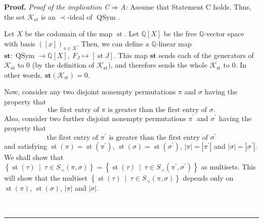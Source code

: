\documentclass[numbers=enddot,12pt,final,onecolumn,notitlepage]{scrartcl}%
\theoremstyle{definition}
\newenvironment{proof}[1][Proof]{\noindent\textbf{#1.} }{\ \rule{0.5em}{0.5em}}
\begin{document}
\begin{proof}
\textit{Proof of the implication C}$\Longrightarrow$\textit{A:} Assume that
Statement C holds. Thus, the set $\mathcal{K}_{\operatorname*{st}}$ is an
$\left.  \prec\right.  $-ideal of $\operatorname*{QSym}$.

Let $X$ be the codomain of the map $\operatorname*{st}$. Let $\mathbb{Q}%
\left[  X\right]  $ be the free $\mathbb{Q}$-vector space with basis $\left(
\left[  x\right]  \right)  _{x\in X}$. Then, we can define a $\mathbb{Q}%
$-linear map $\mathbf{st}:\operatorname*{QSym}\rightarrow\mathbb{Q}\left[
X\right]  ,\ F_{J}\mapsto\left[  \operatorname*{st}J\right]  $. This map
$\mathbf{st}$ sends each of the generators of $\mathcal{K}_{\operatorname*{st}%
}$ to $0$ (by the definition of $\mathcal{K}_{\operatorname*{st}}$), and
therefore sends the whole $\mathcal{K}_{\operatorname*{st}}$ to $0$. In other
words, $\mathbf{st}\left(  \mathcal{K}_{\operatorname*{st}}\right)  =0$.

Now, consider any two disjoint nonempty permutations $\pi$ and $\sigma$ having
the property that%
\[
\text{the first entry of }\pi\text{ is greater than the first entry of }%
\sigma.
\]
Also, consider two further disjoint nonempty permutations $\pi^{\prime}$ and
$\sigma^{\prime}$ having the property that
\[
\text{the first entry of }\pi^{\prime}\text{ is greater than the first entry
of }\sigma^{\prime}%
\]
and satisfying $\operatorname*{st}\left(  \pi\right)  =\operatorname*{st}%
\left(  \pi^{\prime}\right)  $, $\operatorname*{st}\left(  \sigma\right)
=\operatorname*{st}\left(  \sigma^{\prime}\right)  $, $\left\vert
\pi\right\vert =\left\vert \pi^{\prime}\right\vert $ and $\left\vert
\sigma\right\vert =\left\vert \sigma^{\prime}\right\vert $. We shall show that
$\left\{  \operatorname*{st}\left(  \tau\right)  \ \mid\ \tau\in S_{\prec
}\left(  \pi,\sigma\right)  \right\}  =\left\{  \operatorname*{st}\left(
\tau\right)  \ \mid\ \tau\in S_{\prec}\left(  \pi^{\prime},\sigma^{\prime
}\right)  \right\}  $ as multisets. This will show that the multiset $\left\{
\operatorname*{st}\left(  \tau\right)  \ \mid\ \tau\in S_{\prec}\left(
\pi,\sigma\right)  \right\}  $ depends only on $\operatorname*{st}\left(
\pi\right)  $, $\operatorname*{st}\left(  \sigma\right)  $, $\left\vert
\pi\right\vert $ and $\left\vert \sigma\right\vert $.


\end{proof}
\end{document}
